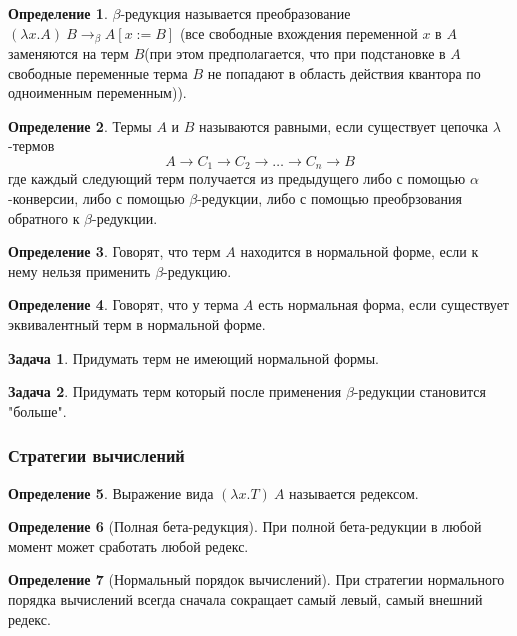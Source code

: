 \documentclass[10pt,twoside]{article}
\theoremstyle{plain}
\theoremstyle{definition}
\newtheorem{defi}{Определение}
\newtheorem{problem}{Задача}
\begin{document}
\begin{defi}
  $\beta$-редукция называется преобразование $(\lambda x.A)\ B\to_\beta A[x:=B]$ (все свободные вхождения переменной $x$ в $A$ заменяются на терм $B$(при этом предполагается, что при подстановке в $A$ свободные переменные терма $B$ не попадают в область действия квантора по одноименным переменным)).
\end{defi}

\begin{defi}
  Термы $A$ и $B$ называются равными, если существует цепочка $\lambda$-термов
  $$A\to C_1\to C_2 \to \dots\to C_n\to B$$
  где каждый следующий терм получается из предыдущего либо с помощью $\alpha$-конверсии, либо с помощью $\beta$-редукции, либо с помощью преобрзования обратного к $\beta$-редукции.
\end{defi}

\begin{defi}
  Говорят, что терм $A$ находится в нормальной форме, если к нему нельзя применить $\beta$-редукцию.
\end{defi}

\begin{defi}
  Говорят, что у терма $A$ есть нормальная форма, если существует эквивалентный терм в нормальной форме.
\end{defi}

\begin{problem}
  Придумать терм не имеющий нормальной формы.
\end{problem}

\begin{problem}
  Придумать терм который после применения $\beta$-редукции становится "больше".
\end{problem}

\subsubsection{Стратегии вычислений}

\begin{defi}
  Выражение вида $(\lambda x.T)\ A$ называется редексом.
\end{defi}

\begin{defi}[Полная бета-редукция]
  При полной бета-редукции в любой момент может сработать любой редекс.
\end{defi}

\begin{defi}[Нормальный порядок вычислений]
  При стратегии нормального порядка вычислений всегда сначала сокращает самый левый, самый внешний редекс.
\end{defi}
\end{document}
